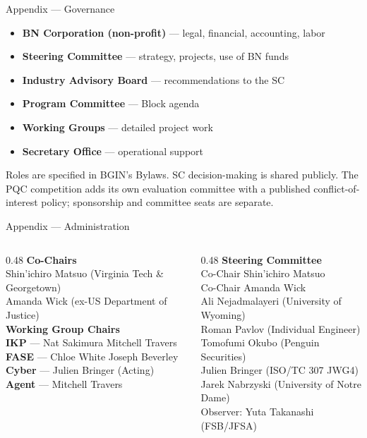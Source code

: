 \documentclass[aspectratio=169,10pt]{beamer}
\begin{document}
\begin{frame}{Appendix --- Governance}
  \begin{itemize}\small
    \item \textbf{BN Corporation (non-profit)} --- legal, financial, accounting, labor
    \item \textbf{Steering Committee} --- strategy, projects, use of BN funds
    \item \textbf{Industry Advisory Board} --- recommendations to the SC
    \item \textbf{Program Committee} --- Block agenda
    \item \textbf{Working Groups} --- detailed project work
    \item \textbf{Secretary Office} --- operational support
  \end{itemize}
  {\small Roles are specified in BGIN's Bylaws. SC decision-making is shared publicly. The PQC competition adds its own evaluation committee with a published conflict-of-interest policy; sponsorship and committee seats are separate.}
\end{frame}

\begin{frame}{Appendix --- Administration}
  \begin{columns}[T]
    \begin{column}{0.48\textwidth}
      {\small\textbf{Co-Chairs}}\\[0.5mm]
      {\small Shin'ichiro Matsuo (Virginia Tech \& Georgetown)\\ Amanda Wick (ex-US Department of Justice)}\\[3mm]
      {\small\textbf{Working Group Chairs}}\\[0.5mm]
      {\small \textbf{IKP} --- Nat Sakimura \textperiodcentered{} Mitchell Travers\\ \textbf{FASE} --- Chloe White \textperiodcentered{} Joseph Beverley\\ \textbf{Cyber} --- Julien Bringer (Acting)\\ \textbf{Agent} --- Mitchell Travers}
    \end{column}
    \begin{column}{0.48\textwidth}
      {\small\textbf{Steering Committee}}\\[0.5mm]
      {\small Co-Chair Shin'ichiro Matsuo\\ Co-Chair Amanda Wick\\ Ali Nejadmalayeri (University of Wyoming)\\ Roman Pavlov (Individual Engineer)\\ Tomofumi Okubo (Penguin Securities)\\ Julien Bringer (ISO/TC 307 JWG4)\\ Jarek Nabrzyski (University of Notre Dame)\\ Observer: Yuta Takanashi (FSB/JFSA)}
    \end{column}
  \end{columns}
\end{frame}
\end{document}
